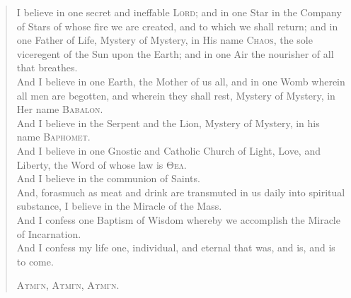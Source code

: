 
\begin{verse}
  I believe in one secret and ineffable \textsc{Lord}; and in one Star in the Company of Stars of whose fire we are created, and to which we shall return; and in one Father of Life, Mystery of Mystery, in His name \textsc{Chaos}, the sole viceregent of the Sun upon the Earth; and in one Air the nourisher of all that breathes. \\

  And I believe in one Earth, the Mother of us all, and in one Womb wherein all men are begotten, and wherein they shall rest, Mystery of Mystery, in Her name \textsc{Babalon}. \\

  And I believe in the Serpent and the Lion, Mystery of Mystery, in his name \textsc{Baphomet}. \\

  And I believe in one Gnostic and Catholic Church of Light, Love, and Liberty, the Word of whose law is \textsc{\textgreek{Θελ}}. \\

  And I believe in the communion of Saints. \\

  And, forasmuch as meat and drink are transmuted in us daily into spiritual substance, I believe in the Miracle of the Mass. \\

  And I confess one Baptism of Wisdom whereby we accomplish the Miracle of Incarnation. \\

  And I confess my life one, individual, and eternal that was, and is, and is to come. \\

  {\centering \textsc{\textgreek{Αυμγν}, \textgreek{Αυμγν}, \textgreek{Αυμγν}.} \par}
\end{verse}
